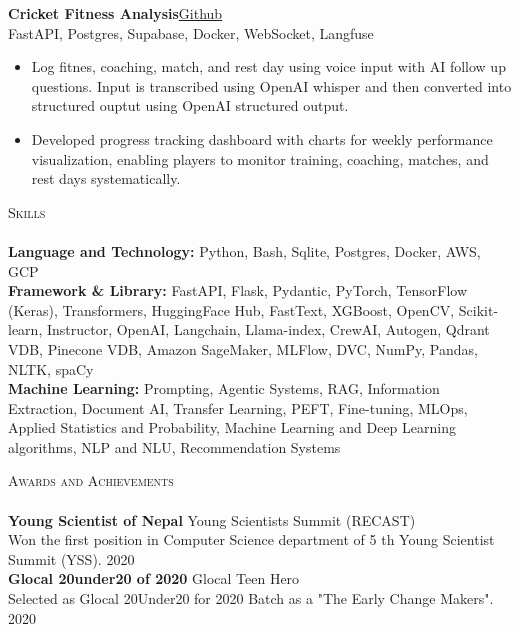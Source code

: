 \documentclass[a4paper]{article}
\newcommand{\lineunder} {
    \vspace*{-8pt} \\
    \hspace*{-18pt} \hrulefill \\
}
\newcommand{\header} [1] {
    {\hspace*{-18pt}\vspace*{6pt} \textsc{#1}}
    \vspace*{-6pt} \lineunder
}
\begin{document}
{\textbf{Cricket Fitness Analysis}}\hfill \href{https://github.com/amit-timalsina/sports-analysis}{Github} \\
FastAPI, Postgres, Supabase, Docker, WebSocket, Langfuse
\vspace{-1mm}
\begin{itemize} \itemsep 0pt
    \item Log fitnes, coaching, match, and rest day using voice input with AI follow up questions. Input is transcribed using OpenAI whisper and then converted into structured ouptut using OpenAI structured output.
    \item Developed progress tracking dashboard with charts for weekly performance visualization, enabling players to monitor training, coaching, matches, and rest days systematically.
\end{itemize}

\header{Skills}
\small{
    \textbf{Language and Technology:}{ Python, Bash, Sqlite, Postgres, Docker, AWS, GCP\\}
    \textbf{Framework \& Library:}{ FastAPI, Flask, Pydantic, PyTorch, TensorFlow (Keras), Transformers, HuggingFace Hub, FastText,
    XGBoost, OpenCV, Scikit-learn, Instructor, OpenAI, Langchain, Llama-index, CrewAI, Autogen, Qdrant VDB, Pinecone VDB, Amazon SageMaker, MLFlow, DVC, NumPy, Pandas, NLTK, spaCy \\}
    \textbf{Machine Learning:}{ Prompting, Agentic Systems, RAG, Information Extraction, Document AI, Transfer Learning, PEFT,
    Fine-tuning, MLOps, Applied Statistics and Probability, Machine Learning and Deep Learning algorithms, NLP and NLU,
    Recommendation Systems \\}
}
\vspace{2mm}

\header{Awards and Achievements}
\textbf{Young Scientist of Nepal} \hfill Young Scientists Summit (RECAST)\\
Won the first position in Computer Science department of 5 th Young Scientist Summit (YSS). \hfill 2020\\
\vspace*{2mm}
\textbf{Glocal 20under20 of 2020} \hfill Glocal Teen Hero\\
Selected as Glocal 20Under20 for 2020 Batch as a "The Early Change Makers". \hfill 2020\\
\vspace*{2mm}
\end{document}
